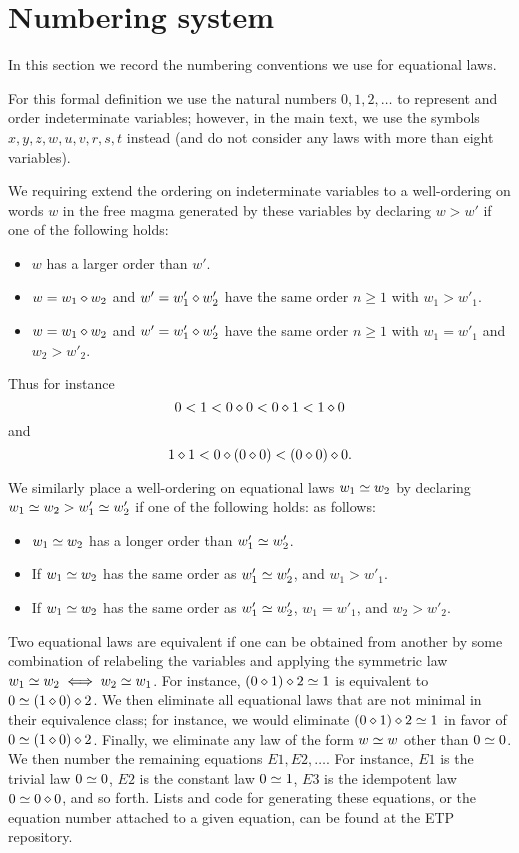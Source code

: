 \section{Numbering system}\label{numbering-app}

In this section we record the numbering conventions we use for equational laws.

For this formal definition we use the natural numbers $0,1,2,\dots$ to represent and order indeterminate variables; however, in the main text, we use the symbols $x,y,z,w,u,v,r,s,t$ instead (and do not consider any laws with more than eight variables).

We requiring extend the ordering on indeterminate variables to a well-ordering on words $w$ in the free magma generated by these variables by declaring $w > w'$ if one of the following holds:
\begin{itemize}
    \item $w$ has a larger order than $w'$.
    \item $w = w_1 \diamond w_2$ and $w' = w'_1 \diamond w'_2$ have the same order $n \geq 1$ with $w_1 > w'_1$.
    \item $w = w_1 \diamond w_2$ and $w' = w'_1 \diamond w'_2$ have the same order $n \geq 1$ with $w_1 = w'_1$ and $w_2 > w'_2$.
\end{itemize}
Thus for instance
$$ 0 < 1 < 0 \diamond 0 < 0 \diamond 1 < 1 \diamond 0 $$
and
$$ 1 \diamond 1 < 0 \diamond (0 \diamond 0) < (0 \diamond 0) \diamond 0.$$

We similarly place a well-ordering on equational laws $w_1 \simeq w_2$ by declaring $w_1 \simeq w_2 > w'_1 \simeq w'_2$ if one of the following holds:
as follows:
\begin{itemize}
\item  $w_1 \simeq w_2$ has a longer order than $w'_1 \simeq w'_2$.
\item If $w_1 \simeq w_2$ has the same order as $w'_1 \simeq w'_2$, and $w_1 > w'_1$.
\item If $w_1 \simeq w_2$ has the same order as $w'_1 \simeq w'_2$, $w_1 = w'_1$, and $w_2 > w'_2$.
\end{itemize}

Two equational laws are equivalent if one can be obtained from another by some combination of relabeling the variables and applying the symmetric law $w_1 \simeq w_2 \iff w_2 \simeq w_1$.  For instance, $(0 \diamond 1) \diamond 2 \simeq 1$ is equivalent to $0 \simeq (1 \diamond 0) \diamond 2$.  We then eliminate all equational laws that are not minimal in their equivalence class; for instance, we would eliminate $(0 \diamond 1) \diamond 2 \simeq 1$ in favor of $0 \simeq (1 \diamond 0) \diamond 2$.  Finally, we eliminate any law of the form $w \simeq w$ other than $0 \simeq 0$.  We then number the remaining equations $E1, E2, \dots$.  For instance, $E1$ is the trivial law $0 \simeq 0$, $E2$ is the constant law $0 \simeq 1$, $E3$ is the idempotent law $0 \simeq 0 \diamond 0$, and so forth.  Lists and code for generating these equations, or the equation number attached to a given equation, can be found at the ETP repository.

